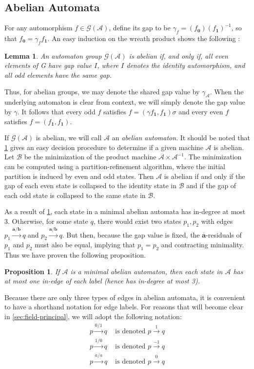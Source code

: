 \documentclass[12pt, letterpaper]{article}
\newcommand{\A}{\mathcal A}
\newcommand{\ch}[1]{\mathbf{#1}}
\newcommand{\res}[2]{{{#1}_{\ch{#2}}}}
\newcommand{\gp}{\mathcal G}
\newcommand{\f}[1]{\overline{#1}}
\newtheorem{lemma}[thm]{Lemma}
\newtheorem{prop}[thm]{Proposition}
\begin{document}
\subsection{Abelian Automata} \label{sec:abelian-automata}
For any automorphism $f \in \gp(\A)$, define its gap to be $\gamma_f =
(\res{f}{0})(\res{f}{1})^{-1}$, so that $\res{f}{0} = \gamma_f \res{f}{1}$. An
easy induction on the wreath product shows the following \cite{Okano-Thesis}:
\begin{lemma}\label{lemma:gap}
    An automaton group $\gp(\A)$ is abelian if, and only if, all even elements
    of G have gap value $I$, where $I$ denotes the identity automorphism, and
    all odd elements have the same gap.
\end{lemma}
Thus, for abelian groups, we may denote the shared gap value by $\gamma_\A$.
When the underlying automaton is clear from context, we will simply denote the
gap value by $\gamma$.  It follows that every odd $f$ satisfies $f = (\gamma
\res{f}{1}, \res{f}{1})\sigma$ and every even $f$ satisfies $f = (\res{f}{1},
\res{f}{1})$.

If $\gp(\A)$ is abelian, we will call $\A$ an \emph{abelian automaton}. It
should be noted that \cref{lemma:gap} gives an easy decision procedure to
determine if a given machine $\A$ is abelian. Let $\mathcal B$ be the
minimization of the product machine $\A \times \A^{-1}$. The minimization can
be computed using  a partition-refinement algorithm, where the initial
partition is induced by even and odd states. Then $\A$ is abelian if and only
if the gap of each even state is collapsed to the identity state in $\mathcal
B$ and if the gap of each odd state is collapsed to the same state in $\mathcal
B$.

As a result of \cref{lemma:gap}, each state in a minimal abelian automata has
in-degree at most 3. Otherwise, for some state $q$, there would exist two
states $p_1, p_2$ with edges $p_1 \xrightarrow{\ch{a} / \ch{b}} q$ and $p_2
\xrightarrow{\ch{a} / \ch{b}} q$. But then, because the gap value is fixed, the
$\f{\ch{a}}$-residuals of $p_1$ and $p_2$ must also be equal, implying that
$p_1 = p_2$ and contracting minimality. Thus we have proven the following
proposition.
\begin{prop}\label{prop:in-degree-3}
    If $\A$ is a minimal abelian automaton, then each state in $\A$ has
    at most one in-edge of each label (hence has in-degree at most 3).
\end{prop}

Because there are only three types of edges in abelian automata, it is
convenient to have a shorthand notation for edge labels. For reasons
that will become clear in \cref{sec:field-principal}, we will adopt the
following notation:
\begin{align*}
    p \xrightarrow{0 / 1} q &\text{ is denoted } p \xrightarrow{1} q\\
    p \xrightarrow{1 / 0} q &\text{ is denoted } p \xrightarrow{-1} q\\
    p \xrightarrow{a / a} q &\text{ is denoted } p \xrightarrow{0} q
\end{align*}
\end{document}

